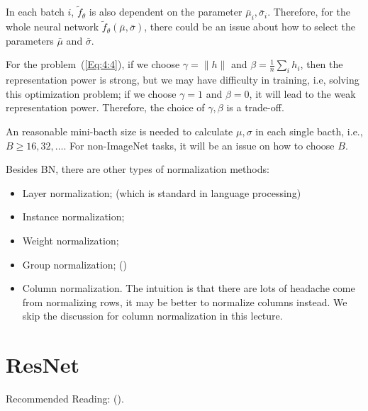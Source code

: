 \begin{remark}
In each batch $i$, $\tilde{f}_{\theta}$ is also dependent on the parameter $\bar{\mu}_i,\bar{\sigma}_i$. 
Therefore, for the whole neural network $\tilde{f}_{\theta}(\bar{\mu},\bar{\sigma})$, there could be an issue about how to select the parameters $\bar{\mu}$ and $\bar{\sigma}$.
\end{remark}
\begin{remark}
For the problem~(\ref{Eq:4:4}), if we choose $\gamma=\|h\|$ and $\beta=\frac{1}{n}\sum_ih_i$, then the representation power is strong, but we may have difficulty in training, i.e, solving this optimization problem;
if we choose $\gamma=1$ and $\beta=0$, it will lead to the weak representation power. Therefore, the choice of $\gamma,\beta$ is a trade-off.
\end{remark}
\begin{remark}
An reasonable mini-bacth size is needed to calculate $\mu,\sigma$ in each single bacth, i.e., $B\ge16,32,\dots$.
For non-ImageNet tasks, it will be an issue on how to choose $B$.
\end{remark}
\begin{remark}
Besides BN, there are other types of normalization methods:
\begin{itemize}
\item
Layer normalization; (which is standard in language processing)
\item
Instance normalization;
\item
Weight normalization;
\item
Group normalization; (\cite{Wu_2018_ECCV})
\item
Column normalization. The intuition is that there are lots of headache come from normalizing rows, it may be better to normalize columns instead. We skip the discussion for column normalization in this lecture.
\end{itemize}
\end{remark}



\section{ResNet}
Recommended Reading: (\cite{He2016res}).

